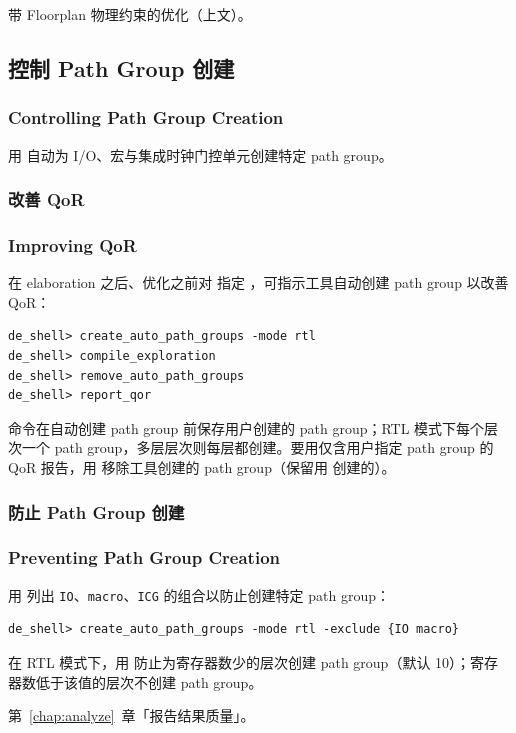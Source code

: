 \begin{seeAlsoBox}
带 Floorplan 物理约束的优化（上文）。
\end{seeAlsoBox}

\subsection{控制 Path Group 创建}
\subsubsection*{Controlling Path Group Creation}

用  自动为 I/O、宏与集成时钟门控单元创建特定 path group。

\subsubsection{改善 QoR}
\subsubsection*{Improving QoR}

在 elaboration 之后、优化之前对  指定 ，可指示工具自动创建 path group 以改善 QoR：
\begin{lstlisting}
de_shell> create_auto_path_groups -mode rtl
de_shell> compile_exploration
de_shell> remove_auto_path_groups
de_shell> report_qor
\end{lstlisting}

命令在自动创建 path group 前保存用户创建的 path group；RTL 模式下每个层次一个 path group，多层层次则每层都创建。要用仅含用户指定 path group 的 QoR 报告，用  移除工具创建的 path group（保留用  创建的）。

\subsubsection{防止 Path Group 创建}
\subsubsection*{Preventing Path Group Creation}

用  列出 \texttt{IO}、\texttt{macro}、\texttt{ICG} 的组合以防止创建特定 path group：
\begin{lstlisting}
de_shell> create_auto_path_groups -mode rtl -exclude {IO macro}
\end{lstlisting}

在 RTL 模式下，用  防止为寄存器数少的层次创建 path group（默认 10）；寄存器数低于该值的层次不创建 path group。

\begin{seeAlsoBox}
第~\ref{chap:analyze}~章「报告结果质量」。
\end{seeAlsoBox}
